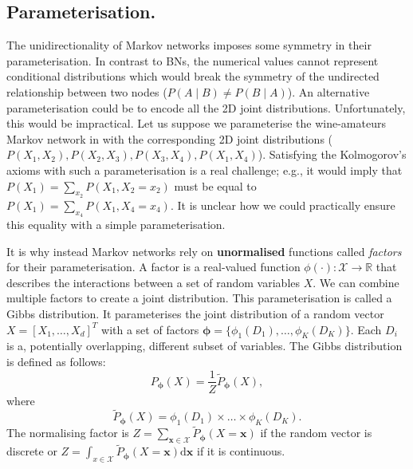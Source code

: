 \subsection{Parameterisation.}
The unidirectionality of Markov networks imposes some symmetry in their parameterisation. In contrast to BNs, the numerical values cannot represent conditional distributions which would break the symmetry of the undirected relationship between two nodes ($P(A \mid B) \neq P(B \mid A)$). An alternative parameterisation could be to encode all the 2D joint distributions. Unfortunately, this would be impractical. Let us suppose we parameterise the wine-amateurs Markov network in  with the corresponding 2D joint distributions ($P(X_1, X_2), P(X_2, X_3), P(X_3, X_4), P(X_1, X_4)$). Satisfying the Kolmogorov's axioms with such a parameterisation is a real challenge; e.g., it would imply that $P(X_1) = \sum_{x_2}P(X_1, X_2=x_2)$ must be equal to $P(X_1) = \sum_{x_4}P(X_1, X_4=x_4)$. It is unclear how we could practically ensure this equality with a simple parameterisation.
%



It is why instead Markov networks rely on \textbf{unormalised} functions called \textit{factors} for their parameterisation. A factor is a real-valued function $\phi(\cdot): \mathcal{X} \rightarrow \mathbb{R}$ that describes the interactions between a set of random variables $X$. We can combine multiple factors to create a joint distribution. This parameterisation is called a Gibbs distribution. It parameterises the joint distribution of a random vector $X = \left[X_1, \hdots, X_d\right]^T$ with a set of factors $\bm{\phi} = \{ \phi_1(D_1), \dots, \phi_K(D_K) \}$. Each $D_i$ is a, potentially overlapping, different subset of variables. The Gibbs distribution is defined as follows:
$$P_{\bm{\phi}}(X) = \frac{1}{Z}\tilde{P}_{\bm{\phi}}(X),$$
where
$$ \tilde{P}_{\bm{\phi}}(X) = \phi_1(D_1) \times \dots \times \phi_K(D_K). $$
The normalising factor is $Z=\sum_{\bm{x} \in \mathcal{X}}\tilde{P}_{\bm{\phi}}(X=\bm{x})$ if the random vector is discrete or $Z=\int_{x \in \mathcal{X}}\tilde{P}_{\bm{\phi}}(X=\bm{x})\text{d}\bm{x}$ if it is continuous.

